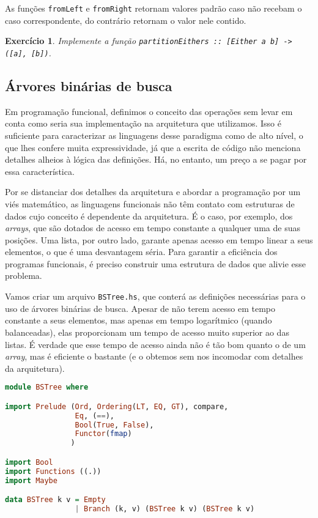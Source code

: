 \documentclass[a4paper]{article}
\newtheorem{exercicio}{Exercício}
\begin{document}
As funções \texttt{fromLeft} e \texttt{fromRight} retornam valores padrão caso não recebam o caso correspondente, do contrário retornam o valor nele contido.

\begin{exercicio}
	Implemente a função \emph{\texttt{partitionEithers :: [Either a b] -> ([a], [b])}}.
\end{exercicio}

\subsection{Árvores binárias de busca}

Em programação funcional, definimos o conceito das operações sem levar em conta como seria sua implementação na arquitetura que utilizamos.
Isso é suficiente para caracterizar as linguagens desse paradigma como de alto nível, o que lhes confere muita expressividade, já que a escrita de código não menciona detalhes alheios à lógica das definições.
Há, no entanto, um preço a se pagar por essa característica.

Por se distanciar dos detalhes da arquitetura e abordar a programação por um viés matemático, as linguagens funcionais não têm contato com estruturas de dados cujo conceito é dependente da arquitetura.
É o caso, por exemplo, dos \emph{arrays}, que são dotados de acesso em tempo constante a qualquer uma de suas posições.
Uma lista, por outro lado, garante apenas acesso em tempo linear a seus elementos, o que é uma desvantagem séria.
Para garantir a eficiência dos programas funcionais, é preciso construir uma estrutura de dados que alivie esse problema.

Vamos criar um arquivo \texttt{BSTree.hs}, que conterá as definições necessárias para o uso de árvores binárias de busca.
Apesar de não terem acesso em tempo constante a seus elementos, mas apenas em tempo logarítmico (quando balanceadas), elas proporcionam um tempo de acesso muito superior ao das listas.
É verdade que esse tempo de acesso ainda não é tão bom quanto o de um \emph{array}, mas é eficiente o bastante (e o obtemos sem nos incomodar com detalhes da arquitetura).

\begin{lstlisting}[language=haskell, frame=single]
module BSTree where

import Prelude (Ord, Ordering(LT, EQ, GT), compare,
                Eq, (==),
                Bool(True, False),
                Functor(fmap)
               )

import Bool
import Functions ((.))
import Maybe

data BSTree k v = Empty
                | Branch (k, v) (BSTree k v) (BSTree k v)
\end{lstlisting}
\end{document}
